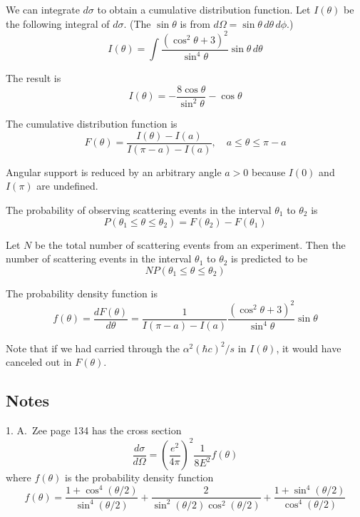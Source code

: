 \documentclass[12pt]{article}
\begin{document}
We can integrate $d\sigma$ to obtain a cumulative distribution function.
Let $I(\theta)$ be the following integral of $d\sigma$.
(The $\sin\theta$ is from $d\Omega=\sin\theta\,d\theta\,d\phi$.)
\begin{equation*}
I(\theta)=\int\frac{\left(\cos^2\theta+3\right)^2}{\sin^4\theta}\sin\theta\,d\theta
\end{equation*}

The result is
\begin{equation*}
I(\theta)=-\frac{8\cos\theta}{\sin^2\theta}-\cos\theta
\end{equation*}

The cumulative distribution function is
\begin{equation*}
F(\theta)=\frac{I(\theta)-I(a)}{I(\pi-a)-I(a)},
\quad
a\le\theta\le\pi-a
\end{equation*}

Angular support is reduced by an arbitrary angle $a>0$ because $I(0)$ and $I(\pi)$ are undefined.

\bigskip
The probability of observing scattering events in the interval $\theta_1$ to $\theta_2$ is
\begin{equation*}
P(\theta_1\le\theta\le\theta_2)=F(\theta_2)-F(\theta_1)
\end{equation*}

Let $N$ be the total number of scattering events from an experiment.
Then the number of scattering events in the interval $\theta_1$
to $\theta_2$ is predicted to be
$$
NP(\theta_1\le\theta\le\theta_2)
$$

The probability density function is
$$
f(\theta)=\frac{dF(\theta)}{d\theta}
=\frac{1}{I(\pi-a)-I(a)}
\frac{\left(\cos^2\theta+3\right)^2}{\sin^4\theta}\sin\theta
$$

Note that if we had carried through the $\alpha^2(\hbar c)^2/s$ in $I(\theta)$,
it would have canceled out in $F(\theta)$.

\subsection*{Notes}
1. A.~Zee page 134 has the cross section
\begin{equation*}
\frac{d\sigma}{d\Omega}=\left(\frac{e^2}{4\pi}\right)^2\frac{1}{8E^2}f(\theta)
\end{equation*}
where $f(\theta)$ is the probability density function
\begin{equation*}
f(\theta)=
\frac{1+\cos^4(\theta/2)}{\sin^4(\theta/2)}
+\frac{2}{\sin^2(\theta/2)\cos^2(\theta/2)}
+\frac{1+\sin^4(\theta/2)}{\cos^4(\theta/2)}
\end{equation*}
\end{document}
